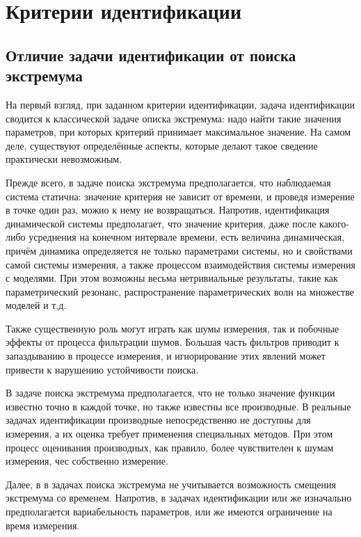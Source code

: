 \chapter{Критерии идентификации}

\section{Отличие задачи идентификации от поиска экстремума}

На первый взгляд, при заданном критерии идентификации, задача идентификации
сводится к классической задаче описка экстремума: надо найти такие значения
параметров, при которых критерий принимает максимальное значение.
На самом деле, существуют определённые аспекты, которые делают такое
сведение практически невозможным.

Прежде всего, в задаче поиска
экстремума предполагается, что наблюдаемая система статична:
значение критерия не зависит от времени, и проведя измерение
в точке один раз, можно к нему не возвращаться.
Напротив, идентификация динамической системы предполагает,
что значение критерия, даже после какого-либо усреднения на конечном
интервале времени, есть величина динамическая, причём динамика определяется
не только параметрами системы, но и свойствами самой системы измерения,
а также процессом взаимодействия системы измерения с моделями. При этом
возможны весьма нетривиальные результаты, такие как параметрический
резонанс, распространение параметрических волн на множестве моделей и т.д.

Также существенную роль могут играть как шумы измерения, так и побочные
эффекты от процесса фильтрации шумов. Большая часть фильтров приводит к запаздыванию
в процессе измерения, и игнорирование этих явлений может привести
к нарушению устойчивости поиска.

В задаче поиска экстремума предполагается, что не только
значение функции известно точно в каждой точке, но также известны все производные.
В реальные задачах идентификации производные непосредственно
не доступны для измерения, а их оценка требует применения специальных
методов. При этом процесс оценивания производных, как правило,
более чувствителен к шумам измерения, чес собственно измерение.

Далее, в в задачах поиска экстремума не учитывается возможность
смещения экстремума со временем. Напротив, в задачах идентификации
или же изначально предполагается вариабельность параметров, или же
имеются ограничение на время измерения.



